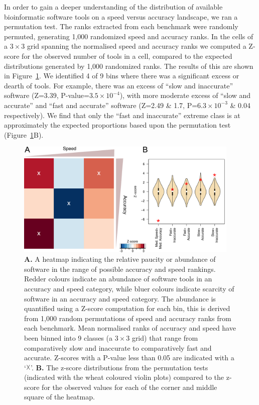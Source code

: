 \documentclass{bmcart}
\begin{document}
In order to gain a deeper understanding of the distribution of
available bioinformatic software tools on a speed versus accuracy
landscape, we ran a permutation test. The ranks extracted
from each benchmark were randomly permuted, generating 1,000
randomized speed and accuracy ranks. In the cells of a $3\times3$
grid spanning the normalised speed and accuracy ranks we computed a
Z-score for the observed number of tools in a cell, compared to the
expected distributions generated by 1,000 randomized ranks. The results
of this are shown in Figure~\ref{fig:speedaccuracy}. We identified {\color{black}4}
of 9 bins where there was a significant excess or dearth of tools. For
example, there was an excess of ``slow and inaccurate'' software ({\color{black}Z=3.39,
P-value=$3.5\times 10^{-4}$}), with more moderate excess of ``slow and accurate'' and ``fast and accurate'' software (Z=2.49 \& 1.7, P=$6.3\times 10^{-3}$ \& 0.04 respectively). We find that only the ``fast and inaccurate'' extreme class is at approximately the
expected proportions based upon the permutation test (Figure~\ref{fig:speedaccuracy}B).


\begin{figure}[htb!]
\centering
\includegraphics[width=0.95\textwidth]{figure2.pdf}
\caption{\textbf{A.} A heatmap indicating the relative paucity or abundance of
  software in the range of possible accuracy and speed rankings. Redder
  colours indicate an abundance of software tools in an accuracy and
  speed category, while bluer colours indicate scarcity of software in
  an accuracy and speed category. The abundance is quantified using a
  Z-score computation for each bin, this is derived from 1,000 random
  permutations of speed and accuracy ranks from each
  benchmark. Mean normalised ranks of accuracy and speed have been
  binned into 9 classes (a $3\times 3$ grid) that range from
  comparatively slow and inaccurate to comparatively
  fast and accurate. Z-scores with a P-value less than 0.05 are indicated
  with a ‘$\vartimes$’. \textbf{B.} The z-score distributions from the permutation tests (indicated with the wheat coloured violin plots) compared to 
  the z-score for the observed values for each of the corner and middle square of the heatmap.}
\label{fig:speedaccuracy}
\end{figure}
\end{document}

